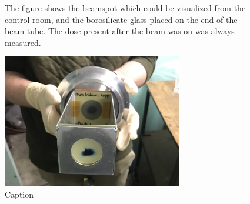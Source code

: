 \begin{figure}%
    \centering
    \caption{The figure shows the beamspot which could be visualized from the control room, and the borosilicate glass placed on the end of the beam tube. The dose present after the beam was on was always measured. }%
    \label{fig:tuning_phosphor+camera}%
\end{figure}

\begin{figure}
    \centering
    \includegraphics[width=0.7\textwidth]{Experiment/gafchromic_tune.jpg}
    \caption{Caption}
    \label{fig:tuning_gafchromic}
\end{figure}

